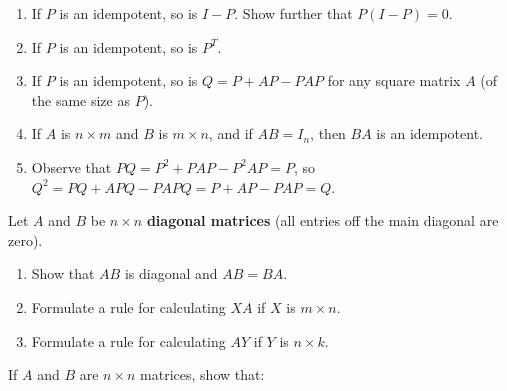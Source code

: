 \begin{multicols}{2}
\begin{ex}
\begin{enumerate}[label={\alph*.}]
\item If $P$ is an idempotent, so is $I - P$. Show further that $P(I - P) = 0$.

\item If $P$ is an idempotent, so is $P^{T}$.

\item If $P$ is an idempotent, so is $Q = P + AP - PAP$ for any square matrix $A$ (of the same size as $P$).

\item If $A$ is $n \times m$ and $B$ is $m \times n$, and if $AB = I_{n}$, then $BA$ is an idempotent.

\end{enumerate}
\begin{sol}
\begin{enumerate}[label={\alph*.}]
\setcounter{enumi}{4}
\item  Observe that $PQ = P^{2} + PAP - P^{2}AP = P$, so $Q^{2} = PQ + APQ - PAPQ = P + AP - PAP = Q$.

\end{enumerate}
\end{sol}
\end{ex}

\begin{ex}
Let $A$ and $B$ be $n \times n$ \textbf{diagonal matrices} (all entries off the main diagonal are zero).


\begin{enumerate}[label={\alph*.}]
\item Show that $AB$ is diagonal and $AB = BA$.

\item Formulate a rule for calculating $XA$ if $X$ is $m \times n$.

\item Formulate a rule for calculating $AY$ if $Y$ is $n \times k$.

\end{enumerate}
\end{ex}

\begin{ex}
If $A$ and $B$ are $n \times n$ matrices, show that:



\end{ex}
\end{multicols}
